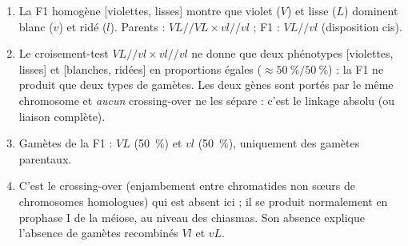 \documentclass[11pt]{article}
\newcommand{\cle}[1]{{\popxbold\color{popdark}#1}}
\begin{document}
\begin{corrige}
\begin{enumerate}
\item La F1 homogène [violettes, lisses] montre que \cle{violet} ($V$) et \cle{lisse} ($L$) dominent \cle{blanc} ($v$) et \cle{ridé} ($l$). Parents : $VL//VL \times vl//vl$ ; F1 : $VL//vl$ (disposition cis).
\item Le croisement-test $VL//vl \times vl//vl$ ne donne que deux phénotypes [violettes, lisses] et [blanches, ridées] en proportions égales ($\approx 50~\%/50~\%$) : la F1 ne produit que deux types de gamètes. Les deux gènes sont portés par le même chromosome et \emph{aucun} crossing-over ne les sépare : c'est le \cle{linkage absolu} (ou liaison complète).
\item Gamètes de la F1 : $VL$ (50~\%) et $vl$ (50~\%), uniquement des gamètes parentaux.
\item C'est le \cle{crossing-over} (enjambement entre chromatides non sœurs de chromosomes homologues) qui est absent ici ; il se produit normalement en \cle{prophase I} de la méiose, au niveau des chiasmas. Son absence explique l'absence de gamètes recombinés $Vl$ et $vL$.
\end{enumerate}
\end{corrige}
\end{document}
